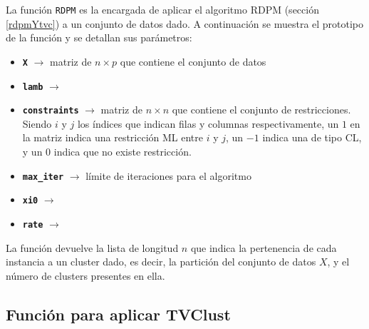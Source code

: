 La función \texttt{RDPM} es la encargada de aplicar el algoritmo \acs{RDPM} (sección \ref{rdpmYtvc}) a un conjunto de datos dado. A continuación se muestra el prototipo de la función y se detallan sus parámetros:


\begin{itemize}
	
	\item \textbf{\texttt{X}} {$\longrightarrow$ matriz de $n \times p$ que contiene el conjunto de datos}
	
	\item \textbf{\texttt{lamb}} {$\longrightarrow$}
	
	\item \textbf{\texttt{constraints}} {$\longrightarrow$ matriz de $n \times n$ que contiene el conjunto de restricciones. Siendo $i$ y $j$ los índices que indican filas y columnas respectivamente, un $1$ en la matriz indica una restricción \acs{ML} entre $i$ y $j$, un $-1$ indica una de tipo \acs{CL}, y un $0$ indica que no existe restricción.}
	
	\item \textbf{\texttt{max\_iter}} {$\longrightarrow$ límite de iteraciones para el algoritmo}
	
	\item \textbf{\texttt{xi0}} {$\longrightarrow$}
	
	\item \textbf{\texttt{rate}} {$\longrightarrow$}
	
\end{itemize}

La función devuelve la lista de longitud $n$ que indica la pertenencia de cada instancia a un cluster dado, es decir, la partición del conjunto de datos $X$, y el número de clusters presentes en ella.

\subsection{Función para aplicar TVClust}


